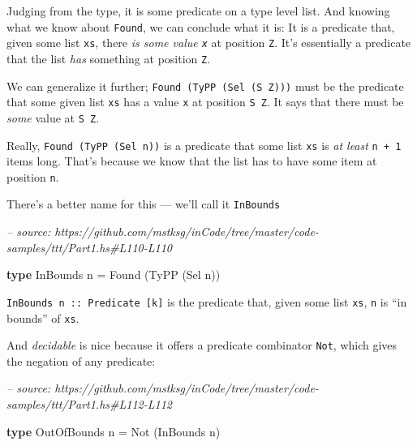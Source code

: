 \documentclass[]{article}
\newenvironment{Shaded}{}{}
\newcommand{\CommentTok}[1]{\textcolor[rgb]{0.38,0.63,0.69}{\textit{#1}}}
\newcommand{\DataTypeTok}[1]{\textcolor[rgb]{0.56,0.13,0.00}{#1}}
\newcommand{\FunctionTok}[1]{\textcolor[rgb]{0.02,0.16,0.49}{#1}}
\newcommand{\KeywordTok}[1]{\textcolor[rgb]{0.00,0.44,0.13}{\textbf{#1}}}
\newcommand{\NormalTok}[1]{#1}
\begin{document}
Judging from the type, it is some predicate on a type level list. And knowing
what we know about \texttt{Found}, we can conclude what it is: It is a predicate
that, given some list \texttt{xs}, there \emph{is some value \texttt{x}} at
position \texttt{\textquotesingle{}Z}. It's essentially a predicate that the
list \emph{has} something at position \texttt{\textquotesingle{}Z}.

We can generalize it further;
\texttt{Found\ (TyPP\ (Sel\ (\textquotesingle{}S\ \textquotesingle{}Z)))} must
be the predicate that some given list \texttt{xs} has a value \texttt{x} at
position \texttt{\textquotesingle{}S\ \textquotesingle{}Z}. It says that there
must be \emph{some} value at \texttt{\textquotesingle{}S\ \textquotesingle{}Z}.

Really, \texttt{Found\ (TyPP\ (Sel\ n))} is a predicate that some list
\texttt{xs} is \emph{at least} \texttt{n\ +\ 1} items long. That's because we
know that the list has to have some item at position \texttt{n}.

There's a better name for this --- we'll call it \texttt{InBounds}

\begin{Shaded}
\begin{Highlighting}[]
\CommentTok{-- source: https://github.com/mstksg/inCode/tree/master/code-samples/ttt/Part1.hs#L110-L110}

\KeywordTok{type} \DataTypeTok{InBounds}\NormalTok{    n }\FunctionTok{=} \DataTypeTok{Found}\NormalTok{ (}\DataTypeTok{TyPP}\NormalTok{ (}\DataTypeTok{Sel}\NormalTok{ n))}
\end{Highlighting}
\end{Shaded}

\texttt{InBounds\ n\ ::\ Predicate\ {[}k{]}} is the predicate that, given some
list \texttt{xs}, \texttt{n} is ``in bounds'' of \texttt{xs}.

And \emph{decidable} is nice because it offers a predicate combinator
\texttt{Not}, which gives the negation of any predicate:

\begin{Shaded}
\begin{Highlighting}[]
\CommentTok{-- source: https://github.com/mstksg/inCode/tree/master/code-samples/ttt/Part1.hs#L112-L112}

\KeywordTok{type} \DataTypeTok{OutOfBounds}\NormalTok{ n }\FunctionTok{=} \DataTypeTok{Not}\NormalTok{ (}\DataTypeTok{InBounds}\NormalTok{ n)}
\end{Highlighting}
\end{Shaded}
\end{document}
